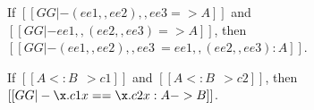 \begin{corollary}[Associativity] \label{lemma:assoc}
  If $[[GG |- (ee1 ,, ee2) ,, ee3 => A  ]]$ and $[[GG |- ee1 ,, (ee2 ,, ee3) => A ]]$, then
  $[[GG |- (ee1 ,, ee2) ,, ee3 ~= ee1 ,, (ee2 ,, ee3) : A]]$.
\end{corollary}

\begin{corollary}
  \label{lemma:coercion_same}
  If $[[A <: B ~~> c1]]$ and $[[A <: B ~~> c2]]$, then $[[GG |- \x . c1 x == \x . c2 x :  A  ->  B ]]$.
\end{corollary}


